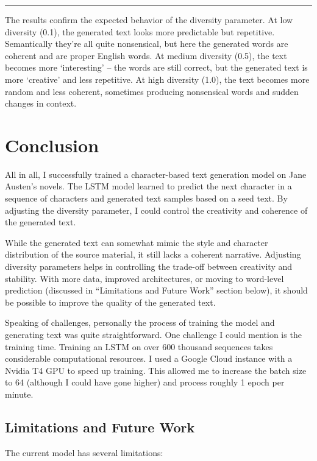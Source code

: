 \documentclass{article}
\begin{document}
\noindent \rule{\textwidth}{0.4pt}

The results confirm the expected behavior of the diversity parameter. At low diversity (0.1), the generated text looks more predictable but repetitive. Semantically they're all quite nonsensical, but here the generated words are coherent and are proper English words. At medium diversity (0.5), the text becomes more `interesting' -- the words are still correct, but the generated text is more `creative' and less repetitive. At high diversity (1.0), the text becomes more random and less coherent, sometimes producing nonsensical words and sudden changes in context.

\section{Conclusion}

All in all, I successfully trained a character-based text generation model on Jane Austen's novels. The LSTM model learned to predict the next character in a sequence of characters and generated text samples based on a seed text. By adjusting the diversity parameter, I could control the creativity and coherence of the generated text.

While the generated text can somewhat mimic the style and character distribution of the source material, it still lacks a coherent narrative. Adjusting diversity parameters helps in controlling the trade-off between creativity and stability. With more data, improved architectures, or moving to word-level prediction (discussed in ``Limitations and Future Work'' section below), it should be possible to improve the quality of the generated text.

Speaking of challenges, personally the process of training the model and generating text was quite straightforward. One challenge I could mention is the training time. Training an LSTM on over 600 thousand sequences takes considerable computational resources. I used a Google Cloud instance with a Nvidia T4 GPU to speed up training. This allowed me to increase the batch size to 64 (although I could have gone higher) and process roughly 1 epoch per minute.

\subsection{Limitations and Future Work}

The current model has several limitations:
\end{document}
